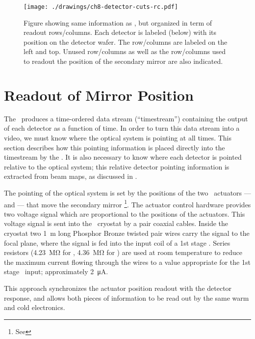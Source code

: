 \begin{figure}
\centering
\texttt{[image: ./drawings/ch8-detector-cuts-rc.pdf]}
\caption[Detector to multiplexing row/column mapping]{
  Figure showing same information as , but organized in term of readout rows/columns. Each detector is labeled (below) with its position on the detector wafer.
  The row/columns are labeled on the left and top. Unused row/columns as well as the row/columns used to readout the position of the secondary mirror are also indicated. }
\label{fig:detector-cuts-rc}
\end{figure}

\section{Readout of Mirror Position}\label{sec:ch8-mirror-readout}

The \Imager\ produces a time-ordered data stream (``timestream'') containing the output of each detector as a function of time.
In order to turn this data stream into a video, we must know where the optical system is pointing at all times.
This section describes how this pointing information is placed directly into the timestream by the \Imager.
It is also necessary to know where each detector is pointed relative to the optical system; this relative detector pointing information is extracted from beam maps, as discussed in .

The pointing of the optical system is set by the positions of the two \BOSE\ actuators ---  and  --- that move the secondary mirror%
\footnote{See }.
The actuator control hardware provides two voltage signal which are proportional to the positions of the actuators.
This voltage signal is sent into the \Imager\ cryostat by a pair coaxial cables.
Inside the cryostat two \SI{1}{m} long Phosphor Bronze  twisted pair wires carry the signal to the focal plane, where the signal is fed into the input coil of a 1st stage \SQUID.
Series resistors (\SI{4.23}{\mega\ohm} for , \SI{4.36}{\mega\ohm} for ) are used at room temperature to reduce the maximum current flowing through the wires to a value appropriate for the 1st stage \SQUID\ input; approximately \SI{2}{\uA}.


This approach synchronizes the actuator position readout with the detector response, and allows both pieces of information to be read out by the same warm and cold electronics.

